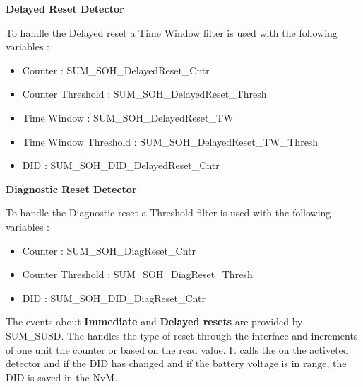 {
    \textbf{Delayed Reset Detector}
    
    
    To handle the Delayed reset a Time Window filter is used  with the following variables :
    
    
    \begin{itemize}
        \item Counter               : SUM_SOH_DelayedReset_Cntr
        \item Counter Threshold     : SUM_SOH_DelayedReset_Thresh
        \item Time Window           : SUM_SOH_DelayedReset_TW
        \item Time Window Threshold : SUM_SOH_DelayedReset_TW_Thresh
        \item DID                   : SUM_SOH_DID_DelayedReset_Cntr
    \end{itemize}
    
}
{
        
}

{
    \textbf{Diagnostic Reset Detector}
    
    
    To handle the Diagnostic reset a Threshold filter is used  with the following variables :
    
    \begin{itemize}
        \item Counter               : SUM_SOH_DiagReset_Cntr
        \item Counter Threshold     : SUM_SOH_DiagReset_Thresh
        \item DID                   : SUM_SOH_DID_DiagReset_Cntr
    \end{itemize}
    
}
{
      
}

{
The events about \textbf{Immediate} and \textbf{Delayed resets} are provided by SUM\_SUSD. \newline\newline
The \textbf{} handles the type of reset through the interface  and increments  of one unit the counter
 or   based on the read value.\newline\newline
It calls the  on the activeted detector and if the DID has changed and if the battery voltage is in range, the DID is saved in the NvM.

}
{
 
} 


